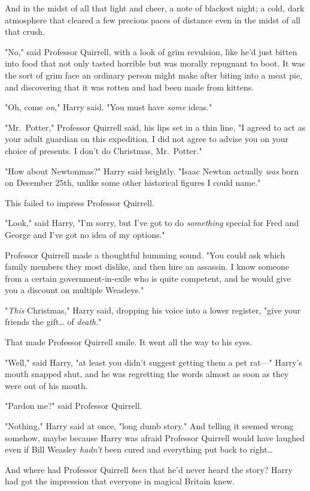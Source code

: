 And in the midst of all that light and cheer, a note of blackest night; a cold,
dark atmosphere that cleared a few precious paces of distance even in the midst
of all that crush.

"No," said Professor Quirrell, with a look of grim revulsion, like he'd just
bitten into food that not only tasted horrible but was morally repugnant to
boot. It was the sort of grim face an ordinary person might make after biting
into a meat pie, and discovering that it was rotten and had been made from
kittens.

"Oh, come \emph{on}," Harry said. "You must have \emph{some} ideas."

"Mr.~Potter," Professor Quirrell said, his lips set in a thin line, "I agreed
to act as your adult guardian on this expedition. I did not agree to advise you
on your choice of presents. I don't do Christmas, Mr.~Potter."

"How about Newtonmas?" Harry said brightly. "Isaac Newton actually \emph{was}
born on December 25th, unlike some other historical figures I could name."

This failed to impress Professor Quirrell.

"Look," said Harry, "I'm sorry, but I've got to do \emph{something} special for
Fred and George and I've got no idea of my options."

Professor Quirrell made a thoughtful humming sound. "You could ask which family
members they most dislike, and then hire an assassin. I know someone from a
certain government-in-exile who is quite competent, and he would give you a
discount on multiple Weasleys."

"\emph{This} Christmas," Harry said, dropping his voice into a lower register,
"give your friends the gift{\ldots} of \emph{death}."

That made Professor Quirrell smile. It went all the way to his eyes.

"Well," said Harry, "at least you didn't suggest getting them a pet rat---"
Harry's mouth snapped shut, and he was regretting the words almost as soon as
they were out of his mouth.

"Pardon me?" said Professor Quirrell.

"Nothing," Harry said at once, "long dumb story." And telling it seemed wrong
somehow, maybe because Harry was afraid Professor Quirrell would have laughed
even if Bill Weasley \emph{hadn't} been cured and everything put back to
right{\ldots}

And where had Professor Quirrell \emph{been} that he'd never heard the story?
Harry had got the impression that everyone in magical Britain knew.

